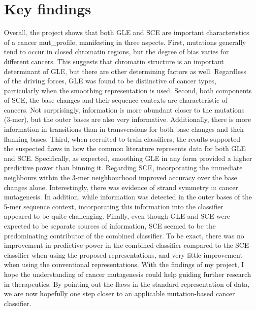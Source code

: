 \section{Key findings}
\label{intro:findings}
Overall, the project shows that both GLE and SCE are important characteristics of a cancer \gls{mut_profile}, manifesting in three aspects. First, mutations generally tend to occur in closed chromatin regions, but the degree of bias varies for different cancers. This suggests that chromatin structure is an important determinant of GLE, but there are other determining factors as well. Regardless of the driving forces, GLE was found to be distinctive of cancer types, particularly when the smoothing representation is used. Second, both components of SCE, the base changes and their sequence contexts are characteristic of cancers. Not surprisingly, information is more abundant closer to the mutations (3-mer), but the outer bases are also very informative. Additionally, there is more information in \glspl{transition} than in \glspl{transversion} for both base changes and their flanking bases. Third, when recruited to train classifiers, the results supported the suspected flaws in how the common literature represents data for both GLE and SCE. Specifically, as expected, smoothing GLE in any form provided a higher predictive power than binning it. Regarding SCE, incorporating the immediate neighbours within the 3-mer neighbourhood improved accuracy over the base changes alone. Interestingly, there was evidence of strand symmetry in cancer mutagenesis. In addition, while information was detected in the outer bases of the 5-mer sequence context, incorporating this information into the classifier appeared to be quite challenging. Finally, even though GLE and SCE were expected to be separate sources of information, SCE seemed to be the predominating contributor of the combined classifier. To be exact, there was no improvement in predictive power in the combined classifier compared to the SCE classifier when using the proposed representations, and very little improvement when using the conventional representations. With the findings of my project, I hope the understanding of cancer mutagenesis could help guiding further research in therapeutics. By pointing out the flaws in the standard representation of data, we are now hopefully one step closer to an applicable mutation-based cancer classifier. 

